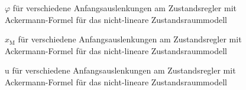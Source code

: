 \documentclass[
	pagesize,
	fontsize=12pt,
	paper=a4,
	oneside,
   reqno
]{scrartcl}
\begin{document}
\begin{figure}[H]
    \centering
    \caption[$\varphi$ für Regler mit Ackermann-Formel (nicht-linear)]{$\varphi$ für verschiedene Anfangsauslenkungen am Zustandsregler mit Ackermann-Formel für das nicht-lineare Zustandsraummodell}
    \label{fig:Bild21}
\end{figure}

\begin{figure}[H]
    \centering
    \caption[$x_{\mathrm{M}}$ für Regler mit Ackermann-Formel (nicht-linear)]{$x_{\mathrm{M}}$ für verschiedene Anfangsauslenkungen am Zustandsregler mit Ackermann-Formel für das nicht-lineare Zustandsraummodell}
    \label{fig:Bild22}
\end{figure}

\begin{figure}[H]
    \centering
    \caption[u für Regler mit Ackermann-Formel (nicht-linear)]{u für verschiedene Anfangsauslenkungen am Zustandsregler mit Ackermann-Formel für das nicht-lineare Zustandsraummodell}
    \label{fig:Bild23}
\end{figure}
\end{document}
